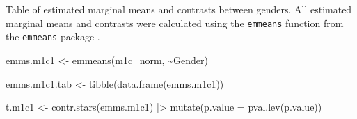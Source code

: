 \documentclass[
  bookmarksnumbered]{article}
\newenvironment{Shaded}{\begin{snugshade}}{\end{snugshade}}
\newcommand{\AttributeTok}[1]{\textcolor[rgb]{0.80,0.80,0.80}{#1}}
\newcommand{\FunctionTok}[1]{\textcolor[rgb]{0.94,0.94,0.56}{#1}}
\newcommand{\NormalTok}[1]{\textcolor[rgb]{0.80,0.80,0.80}{#1}}
\newcommand{\OtherTok}[1]{\textcolor[rgb]{0.94,0.94,0.56}{#1}}
\newcommand{\SpecialCharTok}[1]{\textcolor[rgb]{0.86,0.64,0.64}{#1}}
\begin{document}
Table of estimated marginal means and contrasts between genders. All estimated marginal means and contrasts were calculated using the \texttt{emmeans} function from the \texttt{emmeans} package \autocite{emmeanscit}.

\begin{Shaded}
\begin{Highlighting}[]
\NormalTok{emms.m1c1 }\OtherTok{\textless{}{-}} \FunctionTok{emmeans}\NormalTok{(m1c\_norm, }\SpecialCharTok{\textasciitilde{}}\NormalTok{Gender)}

\NormalTok{emms.m1c1.tab }\OtherTok{\textless{}{-}} \FunctionTok{tibble}\NormalTok{(}\FunctionTok{data.frame}\NormalTok{(emms.m1c1))}

\NormalTok{t.m1c1 }\OtherTok{\textless{}{-}} \FunctionTok{contr.stars}\NormalTok{(emms.m1c1) }\SpecialCharTok{|\textgreater{}}
  \FunctionTok{mutate}\NormalTok{(}\AttributeTok{p.value =} \FunctionTok{pval.lev}\NormalTok{(p.value))}


\end{Highlighting}
\end{Shaded}
\end{document}

